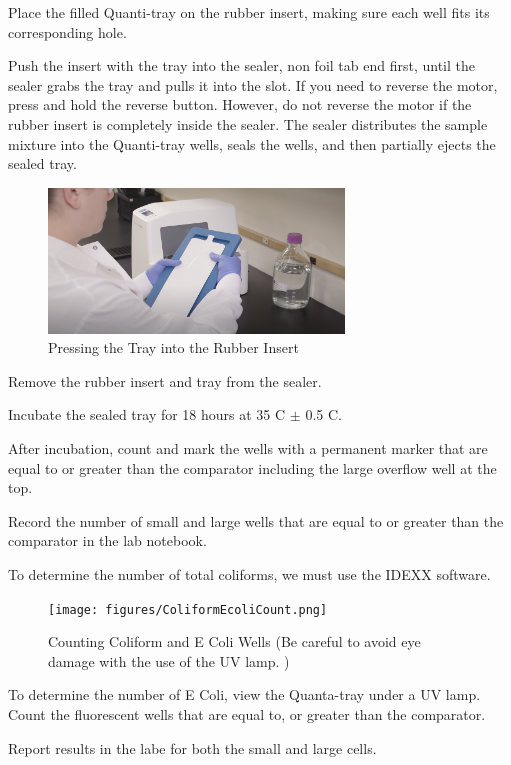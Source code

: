 \documentclass[12pt]{../SOP4_alpha}\usepackage[]{graphicx}\usepackage[]{xcolor}
\begin{document}
\NP Place the filled Quanti-tray on the rubber insert, making sure each well fits its corresponding hole.

\NP Push the insert with the tray into the sealer, non foil tab end first, until the sealer grabs the tray and pulls it into the slot. If you need to reverse the motor, press and hold the reverse button. However, do not reverse the motor if the rubber insert is completely inside the sealer.
The sealer distributes the sample mixture into the Quanti-tray wells, seals the wells, and then partially ejects the sealed tray.

\begin{figure}[h]
\includegraphics[width=0.7\textwidth]{figures/RubberInsert.png}
\caption{Pressing the Tray into the Rubber Insert}
\end{figure}

\NP Remove the rubber insert and tray from the sealer.

\NP Incubate the sealed tray for 18 hours at 35 \degree C $\pm$ 0.5 \degree C.

\NP After incubation, count and mark the wells with a permanent marker that are equal to or greater than the comparator including the large overflow well at the top.

\NP Record the number of small and large wells that are equal to or greater than the comparator in the lab notebook.


\NP To determine the number of total coliforms, we must use the IDEXX software.

\begin{figure}[h]
\centering
\texttt{[image: figures/ColiformEcoliCount.png]}
\caption{Counting Coliform and E Coli Wells (Be careful to avoid eye damage with  the use of the UV lamp.  )}
\end{figure}

\NP To determine the number of E Coli, view the Quanta-tray under a UV lamp. Count the fluorescent wells that are equal to, or greater than the comparator.

\NP Report results in the labe for both the small and large cells.
\end{document}
